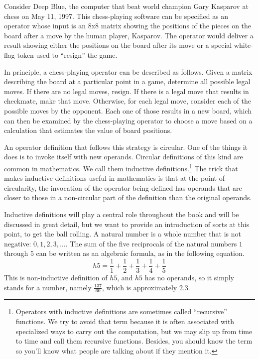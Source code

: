 Consider Deep Blue, the
computer that beat world champion Gary Kasparov at chess on May 11,
1997.  This chess-playing software can be specified as an operator whose input is
an 8x8 matrix showing the positions of the pieces
on the board after a move by the human player, Kasparov.
The operator would deliver a result showing
either the positions on the board after its move or a special
white-flag token used to ``resign'' the game.

In principle, a chess-playing operator can be described as follows.
Given a matrix describing the board at a particular point in a game,
determine all possible legal moves.  If there
are no legal moves, resign.  If there is a legal move that results
in checkmate, make that move.  Otherwise, for each legal move, consider
each of the possible moves by the opponent.  Each one of those results
in a new board, which can then be examined by the chess-playing operator
to choose a move based on a calculation that estimates the value of
board positions.

An operator definition that follows this strategy is circular.
One of the things it does is to invoke itself with new operands.
Circular definitions of this kind are common in mathematics.
We call them inductive definitions.\footnote{Operators
with inductive definitions are sometimes
called ``recursive'' functions. We try to avoid that term because it is
often associated with specialized ways to carry out the computation,
but we may slip up from time to time and call them recursive functions.
Besides, you should know the term so you'll know what people are
talking about if they mention it.}
The trick that makes inductive definitions useful in mathematics
is that at the point of circularity,
the invocation of the operator being defined
has operands that are closer to those in a non-circular part of the
definition than the original operands.

Inductive definitions
will play a central role throughout the book
and will be discussed in great detail, but we want to provide an
introduction of sorts at this point, to get the ball rolling.
A natural number is a whole number that is not negative: $0, 1, 2, 3, \dots$.
The sum of the five reciprocals of the
natural numbers $1$ through $5$
can be written as an algebraic formula, as in the following equation.
\begin{displaymath}
h5 = \frac{1}{1} + \frac{1}{2} + \frac{1}{3} + \frac{1}{4} + \frac{1}{5}
\end{displaymath}
This is non-inductive definition of $h5$,
and $h5$ has no operands, so it simply stands for a number,
namely $\frac{137}{60}$, which is approximately $2.3$.

